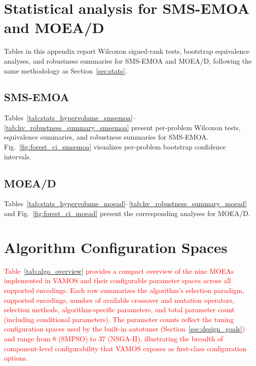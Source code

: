 \documentclass[journal]{IEEEtran}
\newcommand{\VAMOS}{VAMOS}
\begin{document}
\section{Statistical analysis for SMS-EMOA and MOEA/D}
\label{app:stats}

Tables in this appendix report Wilcoxon signed-rank tests, bootstrap equivalence analyses, and robustness summaries for SMS-EMOA and MOEA/D, following the same methodology as Section~\ref{sec:stats}.

\subsection{SMS-EMOA}

Tables~\ref{tab:stats_hypervolume_smsemoa}--\ref{tab:hv_robustness_summary_smsemoa} present per-problem Wilcoxon tests, equivalence summaries, and robustness summaries for SMS-EMOA. Fig.~\ref{fig:forest_ci_smsemoa} visualizes per-problem bootstrap confidence intervals.

\begingroup
\setlength{\tabcolsep}{2pt}

\endgroup

\subsection{MOEA/D}

Tables~\ref{tab:stats_hypervolume_moead}--\ref{tab:hv_robustness_summary_moead} and Fig.~\ref{fig:forest_ci_moead} present the corresponding analyses for MOEA/D.

\begingroup
\setlength{\tabcolsep}{2pt}

\endgroup

\section{Algorithm Configuration Spaces}
\label{app:param_space}

\textcolor{red}{Table~\ref{tab:algo_overview} provides a compact overview of the nine MOEAs implemented in \VAMOS{} and their configurable parameter spaces across all supported encodings. Each row summarizes the algorithm's selection paradigm, supported encodings, number of available crossover and mutation operators, selection methods, algorithm-specific parameters, and total parameter count (including conditional parameters). The parameter counts reflect the tuning configuration spaces used by the built-in autotuner (Section~\ref{sec:design_goals}) and range from 8 (SMPSO) to 37 (NSGA-II), illustrating the breadth of component-level configurability that \VAMOS{} exposes as first-class configuration options.}
\end{document}
